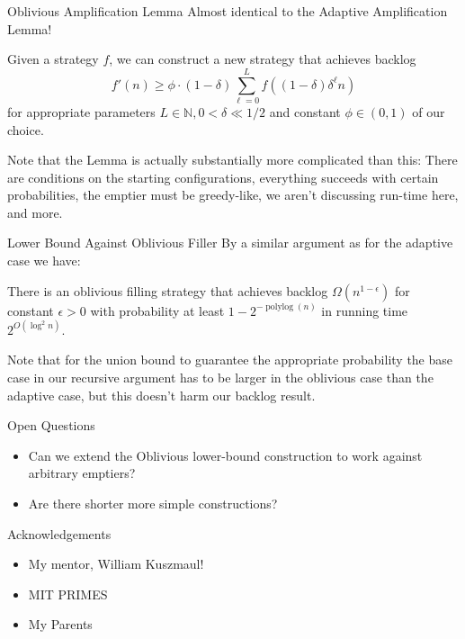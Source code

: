 \documentclass[xcolor=x11names, svgnames, rgb]{beamer}
\newcommand{\polylog}{\operatorname{polylog}}
\begin{document}
\begin{frame}[t]{Oblivious Amplification Lemma}
Almost identical to the Adaptive Amplification Lemma!
  \begin{lemma}
    Given a strategy $f$, we can construct a new strategy that achieves backlog 
    $$f'(n) \ge \phi \cdot (1-\delta)\sum_{\ell=0}^L f((1-\delta)\delta^\ell n)$$
    for appropriate parameters $L\in\mathbb{N}, 0<\delta\ll 1/2$ and constant $\phi \in (0,1)$ of our choice.
  \end{lemma}
  Note that the Lemma is actually substantially more complicated than this: There are conditions
  on the starting configurations, everything succeeds with
  certain probabilities, the emptier must be greedy-like, we aren't discussing run-time here, and more.
\end{frame}

\begin{frame}[t]{Lower Bound Against Oblivious Filler}
  By a similar argument as for the adaptive case we have:
  \begin{theorem}
    There is an oblivious filling strategy that achieves backlog
    $\Omega(n^{1-\epsilon})$ for constant $\epsilon > 0$ with probability at
    least $1-2^{-\polylog(n)}$ in running time $2^{O(\log^2 n)}$.
  \end{theorem}
  Note that for the union bound to guarantee the appropriate probability the
  base case in our recursive argument has to be larger in the oblivious case
  than the adaptive case, but this doesn't harm our backlog result.
\end{frame}

\begin{frame}[t]{Open Questions}
  \begin{itemize}
    \item Can we extend the Oblivious lower-bound construction to work against arbitrary emptiers?
    \item Are there shorter more simple constructions?
  \end{itemize}
\end{frame}

\begin{frame}[t]{Acknowledgements}
  \begin{itemize}
    \item My mentor, William Kuszmaul!
    \item MIT PRIMES
    \item My Parents
 \end{itemize} 
\end{frame}
\end{document}
